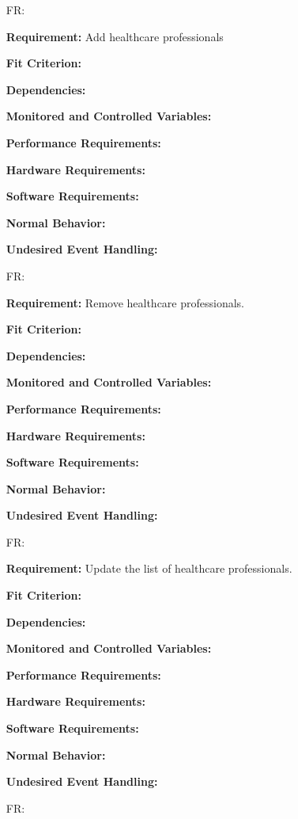 \documentclass[12pt]{article}
\newcounter{reqnum} %
\begin{document}
\begin{itemize}
\item[FR\refstepcounter{reqnum}\thereqnum \label{FR_meaningfulLabel}:]

\textbf{Requirement:} Add healthcare professionals

\textbf{Fit Criterion:}  

\textbf{Dependencies:}  

\textbf{Monitored and Controlled Variables:} 

\textbf{Performance Requirements:} 

\textbf{Hardware Requirements:} 

\textbf{Software Requirements:} 

\textbf{Normal Behavior:} 

\textbf{Undesired Event Handling:} 

\item[FR\refstepcounter{reqnum}\thereqnum \label{FR_meaningfulLabel}:] 

\textbf{Requirement:} Remove healthcare professionals.

\textbf{Fit Criterion:}  

\textbf{Dependencies:}  

\textbf{Monitored and Controlled Variables:} 

\textbf{Performance Requirements:} 

\textbf{Hardware Requirements:} 

\textbf{Software Requirements:} 

\textbf{Normal Behavior:} 

\textbf{Undesired Event Handling:} 

\item[FR\refstepcounter{reqnum}\thereqnum \label{FR_meaningfulLabel}:] 

\textbf{Requirement:} Update the list of healthcare professionals. 

\textbf{Fit Criterion:}  

\textbf{Dependencies:}  

\textbf{Monitored and Controlled Variables:} 

\textbf{Performance Requirements:} 

\textbf{Hardware Requirements:} 

\textbf{Software Requirements:} 

\textbf{Normal Behavior:} 

\textbf{Undesired Event Handling:} 


\item[FR\refstepcounter{reqnum}\thereqnum \label{FR_meaningfulLabel}:] 


\end{itemize}
\end{document}
